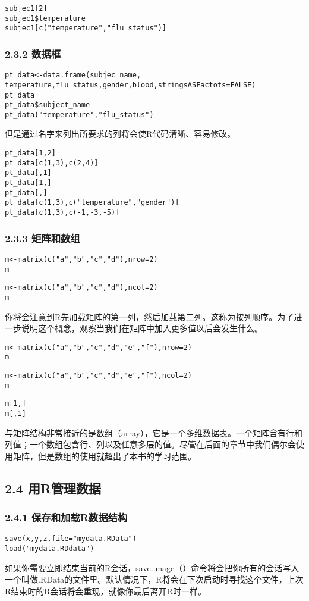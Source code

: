 \documentclass[11pt]{article}
\begin{document}
\begin{verbatim}
subjec1[2]
subjec1$temperature
subjec1[c("temperature","flu_status")]
\end{verbatim}
\subsubsection{2.3.2 数据框}
\label{sec:org1f97fa6}
\begin{verbatim}
pt_data<-data.frame(subjec_name,
temperature,flu_status,gender,blood,stringsASFactots=FALSE)
pt_data
pt_data$subject_name
pt_data("temperature","flu_status")
\end{verbatim}
但是通过名字来列出所要求的列将会使R代码清晰、容易修改。
\begin{verbatim}
pt_data[1,2]
pt_data[c(1,3),c(2,4)]
pt_data[,1]
pt_data[1,]
pt_data[,]
pt_data[c(1,3),c("temperature","gender")]
pt_data[c(1,3),c(-1,-3,-5)]
\end{verbatim}
\subsubsection{2.3.3 矩阵和数组}
\label{sec:org3344d29}
\begin{verbatim}
m<-matrix(c("a","b","c","d"),nrow=2)
m
\end{verbatim}
\begin{verbatim}
m<-matrix(c("a","b","c","d"),ncol=2)
m
\end{verbatim}
你将会注意到R先加载矩阵的第一列，然后加载第二列。这称为按列顺序。为了进一步说明这个概念，观察当我们在矩阵中加入更多值以后会发生什么。

\begin{verbatim}
m<-matrix(c("a","b","c","d","e","f"),nrow=2)
m
\end{verbatim}
\begin{verbatim}
m<-matrix(c("a","b","c","d","e","f"),ncol=2)
m
\end{verbatim}
\begin{verbatim}
m[1,]
m[,1]
\end{verbatim}
与矩阵结构非常接近的是数组（array），它是一个多维数据表。一个矩阵含有行和列值；一个数组包含行、列以及任意多层的值。尽管在后面的章节中我们偶尔会使用矩阵，但是数组的使用就超出了本书的学习范围。
\subsection{2.4 用R管理数据}
\label{sec:orgfaa3e7c}
\subsubsection{2.4.1 保存和加载R数据结构}
\label{sec:org6f3fd94}
\begin{verbatim}
save(x,y,z,file="mydata.RData")
load("mydata.RDdata")
\end{verbatim}
如果你需要立即结束当前的R会话，save.image（）命令将会把你所有的会话写入一个叫做.RData的文件里。默认情况下，R将会在下次启动时寻找这个文件，上次R结束时的R会话将会重现，就像你最后离开R时一样。
\end{document}
